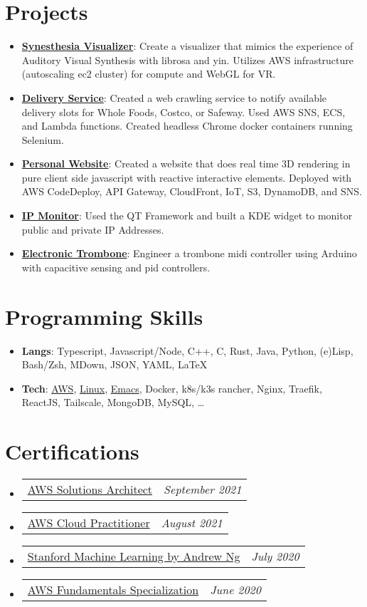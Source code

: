 \documentclass[letterpaper,11pt]{article}
\makeatletter
\newcommand{\resumeItem}[2]{
	\item[]\small{
		\textbf{#1}{: #2 \vspace{-2pt}}
	}
}
\newcommand{\certItem}[2]{
	\vspace{-1pt}\item[]
	\begin{tabular*}{0.96\textwidth}{l@{\extracolsep{\fill}}r}
		#1 & \textit{\small #2} \\
	\end{tabular*}\vspace{-7pt}
}
\newcommand{\resumeSubHeadingListStart}{\begin{itemize}[leftmargin=1mm]}
\newcommand{\resumeSubHeadingListEnd}{\end{itemize}}
\makeatother
\begin{document}
\section{Projects}
\resumeSubHeadingListStart
\resumeItem{\href{https://github.com/sachiniyer/SynesthesiaVisualizer}{Synesthesia Visualizer}}
{Create a visualizer that mimics the experience of Auditory Visual Synthesis with librosa and yin. Utilizes AWS infrastructure (autoscaling ec2 cluster) for compute and WebGL for VR.}
\resumeItem{\href{https://github.com/sachiniyer/delivery-service}{Delivery Service}}
{Created a web crawling service to notify available delivery slots for Whole Foods, Costco, or Safeway. Used AWS SNS, ECS, and Lambda functions. Created headless Chrome docker containers running Selenium.}
\resumeItem{\href{https://sachiniyer.com}{Personal Website}}
{Created a website that does real time 3D rendering in pure client side javascript with reactive interactive elements. Deployed with AWS CodeDeploy, API Gateway, CloudFront, IoT, S3, DynamoDB, and SNS.}
\resumeItem{\href{https://github.com/sachiniyer/ip-monitor}{IP Monitor}}
{Used the QT Framework and built a KDE widget to monitor public and private IP Addresses.}
\resumeItem{\href{https://github.com/sachiniyer/Electric-Trombone}{Electronic Trombone}}
{Engineer a trombone midi controller using Arduino with capacitive sensing and pid controllers.}
\resumeSubHeadingListEnd

%
\section{Programming Skills}
\resumeSubHeadingListStart{}
\resumeItem{Langs}
{Typescript, Javascript/Node, C++, C, Rust, Java, Python, (e)Lisp, Bash/Zsh, MDown, JSON, YAML, \LaTeX} %
\resumeItem{Tech}
{\href{https://www.credly.com/badges/ef46fdf4-2c55-474d-a963-9ee14107160f}{AWS}, \href{https://github.com/sachiniyer/resume/tree/master/environment}{Linux}, \href{https://github.com/sachiniyer/emacs}{Emacs}, Docker, k8s/k3s rancher, Nginx, Traefik, ReactJS, Tailscale, MongoDB, MySQL, \ldots}
\resumeSubHeadingListEnd{}


\section{Certifications}
\resumeSubHeadingListStart{}
\certItem{\href{https://www.credly.com/badges/ef46fdf4-2c55-474d-a963-9ee14107160f}{AWS Solutions Architect}}
{September 2021}
\certItem{\href{https://www.credly.com/badges/c8d7f47f-c6c1-4af9-8391-5b509b92b271}{AWS Cloud Practitioner}}
{August 2021}
\certItem{\href{https://coursera.org/share/29802cca497e8680b26b241d0ef50b59}{Stanford Machine Learning by Andrew Ng}}
{July 2020}
\certItem{\href{https://coursera.org/share/daef661212dab251985d69e4fb71f730}{AWS Fundamentals Specialization}}
{June 2020}
\resumeSubHeadingListEnd{}

\end{document}
